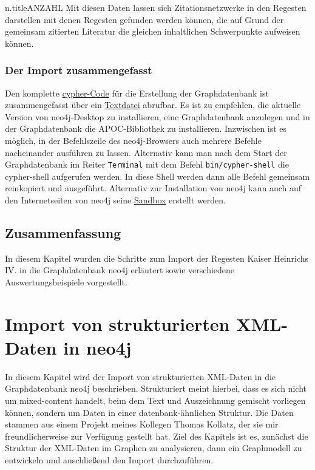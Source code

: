 \textbar n.title\textbar ANZAHL Mit diesen Daten lassen sich
Zitationsnetzwerke in den Regesten darstellen mit denen Regesten
gefunden werden können, die auf Grund der gemeinsam zitierten Literatur
die gleichen inhaltlichen Schwerpunkte aufweisen können.

\hypertarget{der-import-zusammengefasst}{%
\subsubsection{Der Import
zusammengefasst}\label{der-import-zusammengefasst}}

Den komplette
\href{cypher/20_cypher-Datenbankerstellung.txt}{cypher-Code} für die
Erstellung der Graphdatenbank ist zusammengefasst über ein
\href{cypher/20_cypher-Datenbankerstellung.txt}{Textdatei} abrufbar. Es
ist zu empfehlen, die aktuelle Version von neo4j-Desktop zu
installieren, eine Graphdatenbank anzulegen und in der Graphdatenbank
die APOC-Bibliothek zu installieren. Inzwischen ist es möglich, in der
Befehlszeile des neo4j-Browsers auch mehrere Befehle nacheinander
ausführen zu lassen. Alternativ kann man nach dem Start der
Graphdatenbank im Reiter \texttt{Terminal} mit dem Befehl
\texttt{bin/cypher-shell} die cypher-shell aufgerufen werden. In diese
Shell werden dann alle Befehl gemeinsam reinkopiert und ausgeführt.
Alternativ zur Installation von neo4j kann auch auf den Internetseiten
von neo4j seine \href{https://neo4j.com/lp/try-neo4j-sandbox}{Sandbox}
erstellt werden.

\hypertarget{zusammenfassung-2}{%
\subsection{Zusammenfassung}\label{zusammenfassung-2}}

In diesem Kapitel wurden die Schritte zum Import der Regesten Kaiser
Heinrichs IV. in die Graphdatenbank neo4j erläutert sowie verschiedene
Auswertungsbeispiele vorgestellt.

\hypertarget{import-von-strukturierten-xml-daten-in-neo4j}{%
\section{Import von strukturierten XML-Daten in
neo4j}\label{import-von-strukturierten-xml-daten-in-neo4j}}

In diesem Kapitel wird der Import von strukturierten XML-Daten in die
Graphdatenbank neo4j beschrieben. Strukturiert meint hierbei, dass es
sich nicht um mixed-content handelt, beim dem Text und Auszeichnung
gemischt vorliegen können, sondern um Daten in einer datenbank-ähnlichen
Struktur. Die Daten stammen aus einem Projekt meines Kollegen Thomas
Kollatz, der sie mir freundlicherweise zur Verfügung gestellt hat. Ziel
des Kapitels ist es, zunächst die Struktur der XML-Daten im Graphen zu
analysieren, dann ein Graphmodell zu entwickeln und anschließend den
Import durchzuführen.

